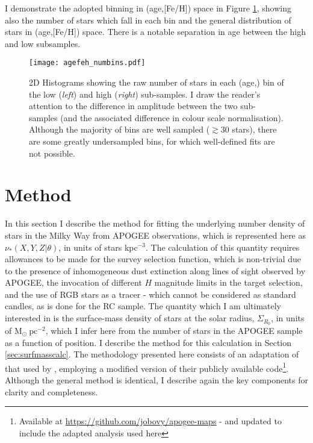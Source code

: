 I demonstrate the adopted binning in (age,[Fe/H]) space in Figure \ref{fig:numbins}, showing also the number of stars which fall in each bin and the general distribution of stars in (age,[Fe/H]) space. There is a notable separation in age between the high and low \afe{} subsamples. 


 \begin{figure}
 	\texttt{[image: agefeh\_numbins.pdf]}
     \caption[2D Histogram demonstrating the number of stars in each age and \feh{} bin, in the high and low \afe{} populations, adopted for modelling the stellar density in the disc]{2D Histograms showing the raw number of stars in each (age,\feh{}) bin of the low (\emph{left}) and high (\emph{right}) \afe{} sub-samples. I draw the reader's attention to the difference in amplitude between the two sub-samples (and the associated difference in colour scale normalisation). Although the majority of bins are well sampled ($\gtrsim 30$ stars), there are some greatly undersampled bins, for which well-defined fits are not possible. }
    \label{fig:numbins}
 \end{figure}

 \section{Method}
 \label{sec:methoda}
 In this section I describe the method for fitting the underlying number density of stars in the Milky Way from APOGEE observations, which is represented here as $\nu_*(X,Y,Z|\theta)$, in units of stars kpc$^{-3}$. The calculation of this quantity requires allowances to be made for the survey selection function, which is non-trivial due to the presence of inhomogeneous dust extinction along lines of sight observed by APOGEE, the invocation of different $H$ magnitude limits in the target selection, and the use of RGB stars as a tracer - which cannot be considered as standard candles, as is done for the RC sample. The quantity which I am ultimately interested in is the surface-mass density of stars at the solar radius, $\Sigma_{R_0}$, in units of $\mathrm{M_{\odot}}\ \mathrm{pc^{-2}}$, which I infer here from the number of stars in the APOGEE sample as a function of position. I describe the method for this calculation in Section \ref{sec:surfmasscalc}. The methodology presented here consists of an adaptation of that used by \citet{2016ApJ...823...30B}, employing a modified version of their publicly available code\footnote{Available at \url{https://github.com/jobovy/apogee-maps} - and updated to include the adapted analysis used here}. Although the general method is identical, I describe again the key components for clarity and completeness.

